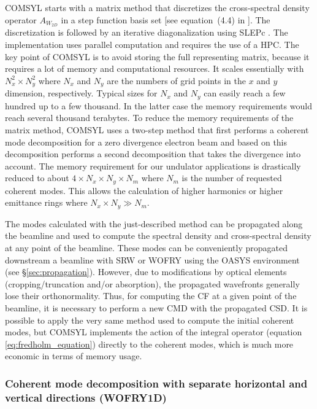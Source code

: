 \documentclass{iucr}              %
\begin{document}
COMSYL starts with a matrix method that discretizes the cross-spectral density operator $A_{W_{2D}}$ in a step function basis set [see equation~(4.4) in \cite{glassThesis}]. The discretization is followed by an iterative diagonalization using SLEPc \cite{SLEPc}. The implementation uses parallel computation and requires the use of a HPC. The key point of COMSYL is to avoid storing the full representing matrix, because it requires a lot of memory and computational resources. It scales essentially with $N_x^2 \times N_y^2$ where $N_x$ and $N_y$ are the numbers of grid points in the $x$ and $y$ dimension, respectively. Typical sizes for $N_x$ and $N_y$ can easily reach a few hundred up to a few thousand. In the latter case the memory requirements would reach several thousand terabytes. To reduce the memory requirements of the matrix method, COMSYL uses a two-step method that first performs a coherent mode decomposition for a zero divergence electron beam and based on this decomposition performs a second decomposition that takes the divergence into account. The memory requirement for our undulator applications is drastically reduced to about $4 \times N_x \times N_y \times N_m$ where $N_m$ is the number of requested coherent modes. This allows the calculation of higher harmonics or higher emittance rings where $N_x \times N_y \gg N_m$. 

The modes calculated with the just-described method can be propagated along the beamline and used to compute the spectral density and cross-spectral density at any point of the beamline. These modes can be conveniently propagated downstream a beamline with SRW or WOFRY using the OASYS environment (see \S\ref{sec:propagation}). However, due to modifications by optical elements (cropping/truncation and/or absorption), the propagated wavefronts generally lose their orthonormality. Thus, for computing the CF at a given point of the beamline, it is necessary to perform a new CMD with the propagated CSD. It is possible to apply the very same method used to compute the initial coherent modes, but COMSYL implements the action of the integral operator (equation \ref{eq:fredholm_equation}) directly to the coherent modes, which is much more economic in terms of memory usage.


\subsubsection{Coherent mode decomposition with separate horizontal and vertical directions (WOFRY1D)\\}\label{sec:WOFRY1D}
\end{document}
